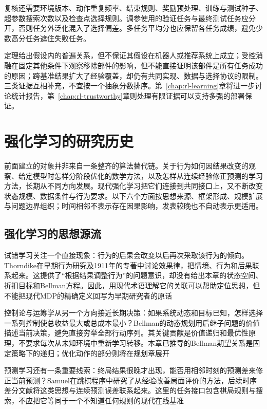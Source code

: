 复核还需要环境版本、动作重复频率、结束规则、奖励预处理、训练与测试种子、超参数搜索次数以及检查点选择规则。调参使用的验证任务与最终测试任务应分开，否则任务外泛化混入了选择偏差。多任务平均分也应保留各任务成绩，避免少数高分任务遮住失败任务。

定理给出假设内的普遍关系，但不保证其假设在机器人或推荐系统上成立；受控消融在固定其他条件下观察移除部件的影响，但不能直接证明该部件是所有任务成功的原因；跨基准结果扩大了经验覆盖，却仍有共同实现、数据与选择协议的限制。三类证据互相补充，不宜按一个抽象分数排序。第~\ref{chap:rl-learning}章将进一步讨论统计报告，第~\ref{chap:rl-trustworthy}章则处理有限证据可以支持多强的部署保证。

\section{强化学习的研究历史}
\label{sec:rl-overview-history}

前面建立的对象并非来自一条整齐的算法替代链。关于行为如何因结果改变的观察、给定模型时怎样分阶段优化的数学方法，以及怎样从连续经验修正预测的学习方法，长期从不同方向发展。现代强化学习把它们连接到共同接口上，又不断改变状态规模、数据条件与行为要求。以下六个方面按思想来源、框架形成、规模扩展与问题边界组织；时间相邻不表示存在因果影响，发表较晚也不自动表示更适用。

\subsection{强化学习的思想源流}
\label{sec:rl-overview-origins}

试错学习关注一个直接现象：行为的后果会改变以后再次采取该行为的倾向。Thorndike在早期行为研究及1911年的专著中讨论效果律，把情境、行为和后果联系起来。这提供了“根据结果调整行为”的问题意识，却没有给出本章的状态空间、折扣目标和Bellman方程。因此，用现代术语理解它的关联可以帮助定位思想，但不能把现代MDP的精确定义回写为早期研究者的原话

控制论与运筹学从另一个方向接近长期决策：如果系统动态和目标已知，怎样选择一系列控制使总收益最大或总成本最小？Bellman的动态规划用后继子问题的价值描述当前决策，避免直接穷举全部行动序列。其关键贡献是价值递归和最优性原理，不要求每次从未知环境中重新学习转移。本章已推导的Bellman期望关系是固定策略下的递归；优化动作的部分则将在规划章展开

预测学习还有一条重要线索：终局结果很晚才出现，能否用相邻时刻的预测差来修正当前预测？Samuel在跳棋程序中研究了从经验改善局面评价的方法，后续时序差分文献将这类思想与连续预测误差联系起来。这里的任务接口包含棋局规则与搜索，不应把它等同于一个不知道任何规则的现代在线基准

